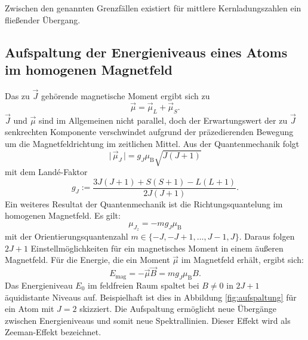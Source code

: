 \documentclass[
  bibliography=totoc,     %
  captions=tableheading,  %
  titlepage=firstiscover, %
]{scrartcl}
\begin{document}
Zwischen den genannten Grenzfällen existiert für mittlere Kernladungszahlen ein
fließender Übergang.
%
\subsection{Aufspaltung der Energieniveaus eines Atoms im homogenen Magnetfeld}
%
Das zu $\vec{J}$ gehörende magnetische Moment ergibt sich zu
%
\begin{equation}
    \vec{\mu}=\vec{\mu}_L+\vec{\mu}_S.
\end{equation}
%
$\vec{J}$ und $\vec{\mu}$ sind im Allgemeinen nicht parallel, doch der
Erwartungswert der zu $\vec{J}$ senkrechten Komponente verschwindet aufgrund
der präzedierenden Bewegung um die Magnetfeldrichtung im zeitlichen Mittel.
Aus der Quantenmechanik folgt
%
\begin{equation}
     \lvert\,\vec{\mu}_J\,\rvert=g_J\mu_{\mathup{B}}\sqrt{J(J+1)}
\end{equation}
%
mit dem Landé-Faktor
%
\begin{equation}
    g_J:=\frac{3J(J+1)+S(S+1)-L(L+1)}{2J(J+1)}.
    \label{eq:g_J}
\end{equation}
%
Ein weiteres Resultat der Quantenmechanik ist die Richtungsquantelung im
homogenen Magnetfeld. Es gilt:
%
\begin{equation}
    \mu_{J_z}=-mg_J\mu_{\mathup{B}}
\end{equation}
%
mit der Orientierungsquantenzahl $m\in\{-J,-J+1,\ldots,J-1,J\}$.
Daraus folgen $2J+1$ Einstellmöglichkeiten für ein magnetisches Moment in einem
äußeren Magnetfeld. Für die Energie, die ein Moment $\vec{\mu}$ im Magnetfeld
erhält, ergibt sich:
%
\begin{equation}
    E_{\mathup{mag}}=-\vec{\mu}\vec{B}=mg_J\mu_{\mathup{B}}B.
    \label{eq:E_mag}
\end{equation}
%
Das Energieniveau $E_0$ im feldfreien Raum spaltet bei $B\neq0$ in $2J+1$
äquidistante Niveaus auf. Beispielhaft ist dies in Abbildung
\ref{fig:aufspaltung} für ein Atom mit $J=2$ skizziert. Die Aufspaltung
ermöglicht neue Übergänge zwischen Energieniveaus und somit neue Spektrallinien.
Dieser Effekt wird als Zeeman-Effekt bezeichnet.
%
\end{document}
